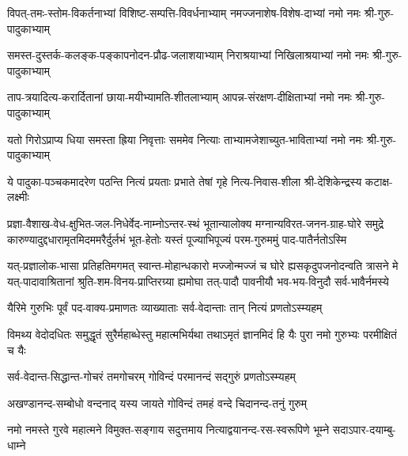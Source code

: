 \twolineshloka
{विपत्-तमः-स्तोम-विकर्तनाभ्यां विशिष्ट-सम्पत्ति-विवर्धनाभ्याम्}
{नमज्जनाशेष-विशेष-दाभ्यां नमो नमः श्री-गुरु-पादुकाभ्याम्}

\twolineshloka
{समस्त-दुस्तर्क-कलङ्क-पङ्कापनोदन-प्रौढ-जलाशयाभ्याम्}
{निराश्रयाभ्यां निखिलाश्रयाभ्यां नमो नमः श्री-गुरु-पादुकाभ्याम्}

\twolineshloka
{ताप-त्रयादित्य-करार्दितानां छाया-मयीभ्यामति-शीतलाभ्याम्}
{आपन्न-संरक्षण-दीक्षिताभ्यां नमो नमः श्री-गुरु-पादुकाभ्याम्}

\twolineshloka
{यतो गिरोऽप्राप्य धिया समस्ता ह्रिया निवृत्ताः सममेव नित्याः}
{ताभ्यामजेशाच्युत-भाविताभ्यां नमो नमः श्री-गुरु-पादुकाभ्याम्}

\twolineshloka
{ये पादुका-पञ्चकमादरेण पठन्ति नित्यं प्रयताः प्रभाते}
{तेषां गृहे नित्य-निवास-शीला श्री-देशिकेन्द्रस्य कटाक्ष-लक्ष्मीः}



\fourlineindentedshloka
{प्रज्ञा-वैशाख-वेध-क्षुभित-जल-निधेर्वेद-नाम्नोऽन्तर-स्थं}
{भूतान्यालोक्य मग्नान्यविरत-जनन-ग्राह-घोरे समुद्रे}
{कारुण्यादुद्दधारामृतमिदममरैर्दुर्लभं भूत-हेतोः}
{यस्तं पूज्याभिपूज्यं परम-गुरुममुं पाद-पातैर्नतोऽस्मि}

\fourlineindentedshloka
{यत्-प्रज्ञालोक-भासा प्रतिहतिमगमत् स्वान्त-मोहान्धकारो}
{मज्जोन्मज्जं च घोरे ह्यसकृदुपजनोदन्वति त्रासने मे}
{यत्-पादावाश्रितानां श्रुति-शम-विनय-प्राप्तिरग्र्या ह्यमोघा}
{तत्-पादौ पावनीयौ भव-भय-विनुदौ सर्व-भावैर्नमस्ये}


\twolineshloka
{यैरिमे गुरुभिः पूर्वं पद-वाक्य-प्रमाणतः}
{व्याख्याताः सर्व-वेदान्ताः तान् नित्यं प्रणतोऽस्म्यहम्}


\twolineshloka
{विमथ्य वेदोदधितः समुद्धृतं सुरैर्महाब्धेस्तु महात्मभिर्यथा}
{तथाऽमृतं ज्ञानमिदं हि यैः पुरा नमो गुरुभ्यः परमीक्षितं च यैः}


\twolineshloka
{सर्व-वेदान्त-सिद्धान्त-गोचरं तमगोचरम्}
{गोविन्दं परमानन्दं सद्गुरुं प्रणतोऽस्म्यहम्}

\twolineshloka
{अखण्डानन्द-सम्बोधो वन्दनाद् यस्य जायते}
{गोविन्दं तमहं वन्दे चिदानन्द-तनुं गुरुम्}

\fourlineindentedshloka
{नमो नमस्ते गुरवे महात्मने}
{विमुक्त-सङ्गाय सदुत्तमाय}
{नित्याद्वयानन्द-रस-स्वरूपिणे}
{भूम्ने सदाऽपार-दयाम्बु-धाम्ने}

